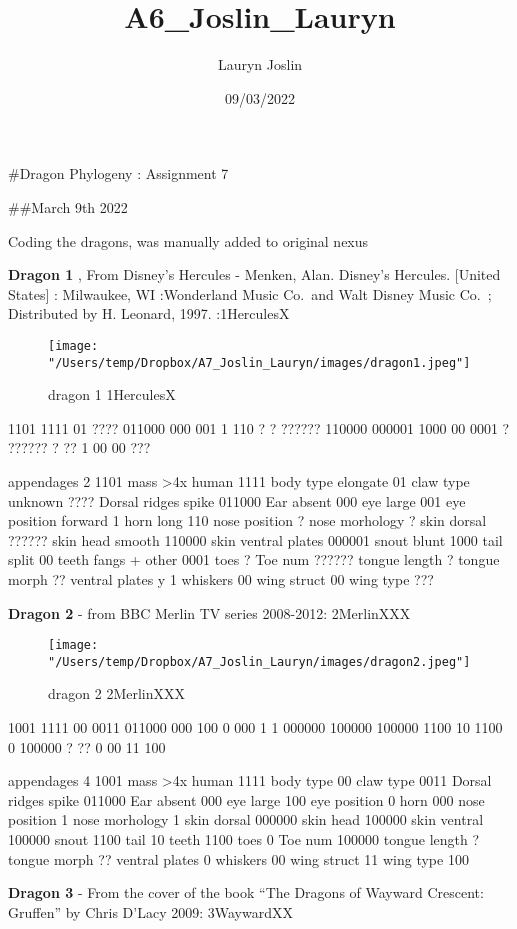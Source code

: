 \documentclass[
]{article}
\title{A6\_Joslin\_Lauryn}
\author{Lauryn Joslin}
\date{09/03/2022}
\begin{document}
\maketitle

\#Dragon Phylogeny : Assignment 7

\#\#March 9th 2022

Coding the dragons, was manually added to original nexus

\textbf{Dragon 1} , From Disney's Hercules - Menken, Alan. Disney's
Hercules. {[}United States{]} : Milwaukee, WI :Wonderland Music Co.~and
Walt Disney Music Co.~; Distributed by H. Leonard, 1997. :1HerculesX

\begin{figure}
\centering
\texttt{[image: "/Users/temp/Dropbox/A7\_Joslin\_Lauryn/images/dragon1.jpeg"]}
\caption{dragon 1 1HerculesX}
\end{figure}

1101 1111 01 ???? 011000 000 001 1 110 ? ? ?????? 110000 000001 1000 00
0001 ? ?????? ? ?? 1 00 00 ???

appendages 2 1101 mass \textgreater4x human 1111 body type elongate 01
claw type unknown ???? Dorsal ridges spike 011000 Ear absent 000 eye
large 001 eye position forward 1 horn long 110 nose position ? nose
morhology ? skin dorsal ?????? skin head smooth 110000 skin ventral
plates 000001 snout blunt 1000 tail split 00 teeth fangs + other 0001
toes ? Toe num ?????? tongue length ? tongue morph ?? ventral plates y 1
whiskers 00 wing struct 00 wing type ???

\textbf{Dragon 2} - from BBC Merlin TV series 2008-2012: 2MerlinXXX

\begin{figure}
\centering
\texttt{[image: "/Users/temp/Dropbox/A7\_Joslin\_Lauryn/images/dragon2.jpeg"]}
\caption{dragon 2 2MerlinXXX}
\end{figure}

1001 1111 00 0011 011000 000 100 0 000 1 1 000000 100000 100000 1100 10
1100 0 100000 ? ?? 0 00 11 100

appendages 4 1001 mass \textgreater4x human 1111 body type 00 claw type
0011 Dorsal ridges spike 011000 Ear absent 000 eye large 100 eye
position 0 horn 000 nose position 1 nose morhology 1 skin dorsal 000000
skin head 100000 skin ventral 100000 snout 1100 tail 10 teeth 1100 toes
0 Toe num 100000 tongue length ? tongue morph ?? ventral plates 0
whiskers 00 wing struct 11 wing type 100

\textbf{Dragon 3} - From the cover of the book ``The Dragons of Wayward
Crescent: Gruffen'' by Chris D'Lacy 2009: 3WaywardXX
\end{document}
